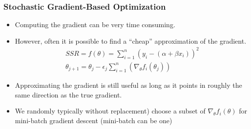 \documentclass[
  shownotes,
  xcolor={svgnames},
  hyperref={colorlinks,citecolor=DarkBlue,linkcolor=DarkRed,urlcolor=DarkBlue}
  , aspectratio=169]{beamer}
\begin{document}
\begin{frame}[fragile]
\frametitle{Stochastic Gradient-Based Optimization}

\begin{itemize}
  \item Computing the gradient can be very time consuming. 
  \item However, often it is possible to find a “cheap” approximation of the gradient. 
\begin{align}
  SSR=f(\theta)=\sum_{i=1}^{n}(y_{i}-(\alpha+\beta x_{i}))^{2} \nonumber \\
\theta_{j+1}=\theta_j -\epsilon_j \sum_{i=1}^n(\nabla_{\theta} f_i(\theta_j))\nonumber 
\end{align}


\item Approximating the gradient is still useful as long as it points in roughly the same direction as the true gradient.
\item We randomly typically without replacement) choose a subset of $\nabla_{\theta} f_i(\theta)$ for mini-batch gradient descent (mini-batch can be one)

\end{itemize}

 \end{frame}
\end{document}
